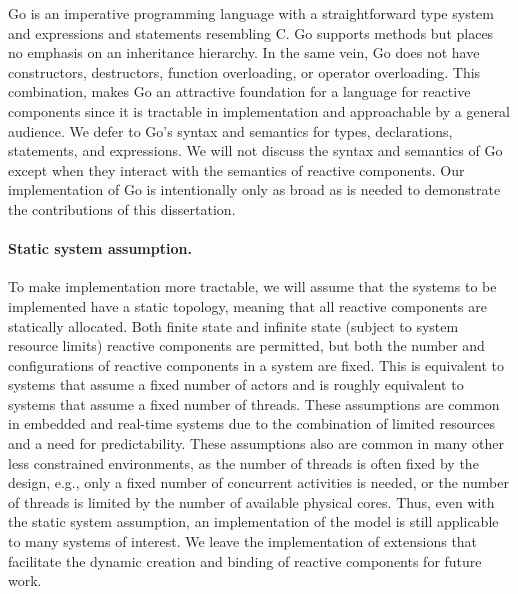 Go is an imperative programming language with a straightforward type system and expressions and statements resembling C.
Go supports methods but places no emphasis on an inheritance hierarchy.
In the same vein, Go does not have constructors, destructors, function overloading, or operator overloading.
This combination, makes Go an attractive foundation for a language for reactive components since it is tractable in implementation and approachable by a general audience.
We defer to Go's syntax and semantics for types, declarations, statements, and expressions.
We will not discuss the syntax and semantics of Go except when they interact with the semantics of reactive components.
Our implementation of Go is intentionally only as broad as is needed to demonstrate the contributions of this dissertation.

\paragraph{Static system assumption.}
To make implementation more tractable, we will assume that the systems to be implemented have a static topology, meaning that all reactive components are statically allocated.
Both finite state and infinite state (subject to system resource limits) reactive components are permitted, but both the number and configurations of reactive components in a system are fixed.
This is equivalent to systems that assume a fixed number of actors and is roughly equivalent to systems that assume a fixed number of threads.
These assumptions are common in embedded and real-time systems due to the combination of limited resources and a need for predictability.
These assumptions also are common in many other less constrained environments, as the number of threads is often fixed by the design, e.g., only a fixed number of concurrent activities is needed, or the number of threads is limited by the number of available physical cores.
Thus, even with the static system assumption, an implementation of the model is still applicable to many systems of interest.
We leave the implementation of extensions that facilitate the dynamic creation and binding of reactive components for future work.

